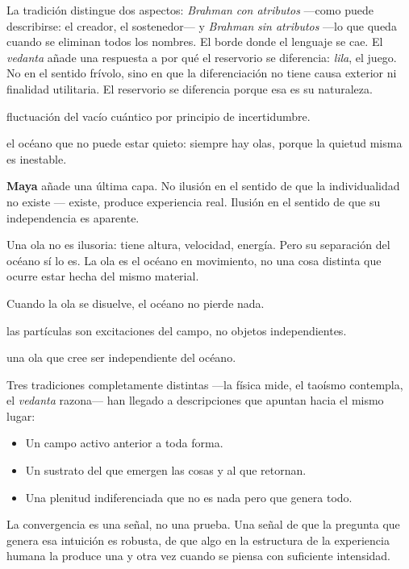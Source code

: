 La tradición distingue dos aspectos: \emph{Brahman} \emph{con atributos} —como puede describirse: el creador, el sostenedor— y \emph{Brahman} \emph{sin atributos} —lo que queda cuando se eliminan todos los nombres. El borde donde el lenguaje se cae. El \emph{vedanta} añade una respuesta a por qué el reservorio se diferencia: \emph{lila}, el juego. No en el sentido frívolo, sino en que la diferenciación no tiene causa exterior ni finalidad utilitaria. El reservorio se diferencia porque esa es su naturaleza.

\begin{fisica}
 fluctuación del vacío cuántico por principio de incertidumbre.

 el océano que no puede estar quieto: siempre hay olas, porque la quietud misma es inestable.
\end{fisica}
\noindent \textbf{Maya} añade una última capa. No ilusión en el sentido de que la individualidad no existe — existe, produce experiencia real. Ilusión en el sentido de que su independencia es aparente.

Una ola no es ilusoria: tiene altura, velocidad, energía. Pero su separación del océano sí lo es. La ola es el océano en movimiento, no una cosa distinta que ocurre estar hecha del mismo material.

Cuando la ola se disuelve, el océano no pierde nada.

\begin{fisica}
 las partículas son excitaciones del campo, no objetos independientes.

 una ola que cree ser independiente del océano.
\end{fisica}
\noindent Tres tradiciones completamente distintas —la física mide, el taoísmo contempla, el \emph{vedanta} razona— han llegado a descripciones que apuntan hacia el mismo lugar:

\begin{itemize}
\item Un campo activo anterior a toda forma.
\item Un sustrato del que emergen las cosas y al que retornan.
\item Una plenitud indiferenciada que no es nada pero que genera todo.
\end{itemize}
La convergencia es una señal, no una prueba. Una señal de que la pregunta que genera esa intuición es robusta, de que algo en la estructura de la experiencia humana la produce una y otra vez cuando se piensa con suficiente intensidad.

